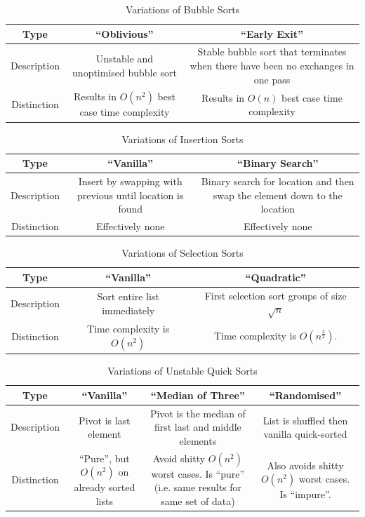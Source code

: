 \documentclass[a4paper]{scrartcl}
\begin{document}
\begin{table}
    \centering
    \begin{tabulary}{\linewidth}{c | C | C}
        Type & ``Oblivious'' & ``Early Exit'' \\
        \hline
        Description & Unstable and unoptimised bubble sort & Stable bubble sort that terminates when there have been no exchanges in one pass \\
        \hline
        Distinction & Results in \(O(n^2)\) best case time complexity & Results in \(O(n)\) best case time complexity
    \end{tabulary}
    \caption{Variations of Bubble Sorts}
    \label{tab:bubble_sorts}
\end{table}

\begin{table}
    \centering
    \begin{tabulary}{\linewidth}{c | C | C}
        Type & ``Vanilla'' & ``Binary Search'' \\
        \hline
        Description & Insert by swapping with previous until location is found & Binary search for location and then swap the element down to the location \\
        \hline
        Distinction & Effectively none & Effectively none
    \end{tabulary}
    \caption{Variations of Insertion Sorts}
    \label{tab:insertion_sorts}
\end{table}

\begin{table}
    \centering
    \begin{tabulary}{\linewidth}{c | C | C}
        Type & ``Vanilla'' & ``Quadratic'' \\
        \hline
        Description & Sort entire list immediately & First selection sort groups of size \(\sqrt{n}\) \\
        \hline
        Distinction & Time complexity is \(O(n^2)\) & Time complexity is \(O(n^\frac32)\).
    \end{tabulary}
    \caption{Variations of Selection Sorts}
    \label{tab:selection_sorts}
\end{table}

\begin{table}
    \centering
    \begin{tabulary}{\linewidth}{c | C | C | C}
        Type & ``Vanilla'' & ``Median of Three'' & ``Randomised'' \\
        \hline
        Description & Pivot is last element & Pivot is the median of first last and middle elements & List is shuffled then vanilla quick-sorted \\
        \hline
        Distinction & ``Pure'', but \(O(n^2)\) on already sorted lists & Avoid shitty \(O(n^2)\) worst cases. Is ``pure'' (i.e. same results for same set of data) & Also avoids shitty \(O(n^2)\) worst cases. Is ``impure''.
    \end{tabulary}
    \caption{Variations of Unstable Quick Sorts}
    \label{tab:quick_sorts}
\end{table}
\end{document}
